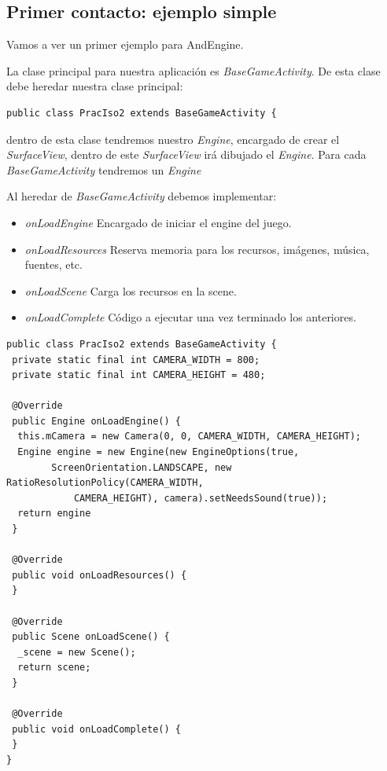 \documentclass[12 pt, a4paper, twoside]{article}
\begin{document}


\clearpage
\subsection{Primer contacto: ejemplo simple}
Vamos a ver un primer ejemplo para AndEngine.

La clase principal para nuestra aplicación es
\emph{BaseGameActivity}. De esta clase debe heredar nuestra clase principal:

\begin{verbatim}
public class PracIso2 extends BaseGameActivity {
\end{verbatim}

dentro de esta clase tendremos nuestro \emph{Engine}, encargado de
crear el \emph{SurfaceView}, dentro de este \emph{SurfaceView} irá
dibujado el \emph{Engine}. Para cada \emph{BaseGameActivity} tendremos
un \emph{Engine}

Al heredar de \emph{BaseGameActivity} debemos implementar:

\begin{itemize}
\item \emph{onLoadEngine} Encargado de iniciar el engine del juego.
\item \emph{onLoadResources} Reserva memoria para los recursos, imágenes, música,
  fuentes, etc.
\item \emph{onLoadScene} Carga los recursos en la scene.
\item \emph{onLoadComplete} Código a ejecutar una vez terminado los anteriores.
\end{itemize}
{\tiny
\begin{verbatim}
public class PracIso2 extends BaseGameActivity {
 private static final int CAMERA_WIDTH = 800;
 private static final int CAMERA_HEIGHT = 480;

 @Override
 public Engine onLoadEngine() {
  this.mCamera = new Camera(0, 0, CAMERA_WIDTH, CAMERA_HEIGHT);
  Engine engine = new Engine(new EngineOptions(true,
        ScreenOrientation.LANDSCAPE, new RatioResolutionPolicy(CAMERA_WIDTH,
            CAMERA_HEIGHT), camera).setNeedsSound(true));
  return engine
 }

 @Override
 public void onLoadResources() {
 }

 @Override
 public Scene onLoadScene() {
  _scene = new Scene();
  return scene;
 }

 @Override
 public void onLoadComplete() {
 }
}

\end{verbatim}
}
\end{document}
